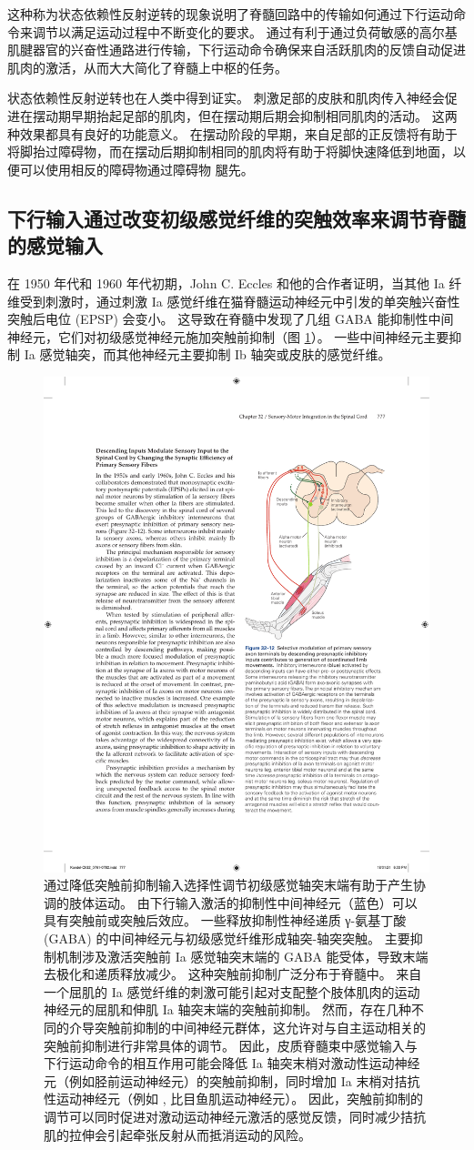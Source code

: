 这种称为状态依赖性反射逆转的现象说明了脊髓回路中的传输如何通过下行运动命令来调节以满足运动过程中不断变化的要求。 通过有利于通过负荷敏感的高尔基肌腱器官的兴奋性通路进行传输，下行运动命令确保来自活跃肌肉的反馈自动促进肌肉的激活，从而大大简化了脊髓上中枢的任务。

状态依赖性反射逆转也在人类中得到证实。 刺激足部的皮肤和肌肉传入神经会促进在摆动期早期抬起足部的肌肉，但在摆动期后期会抑制相同肌肉的活动。 这两种效果都具有良好的功能意义。 在摆动阶段的早期，来自足部的正反馈将有助于将脚抬过障碍物，而在摆动后期抑制相同的肌肉将有助于将脚快速降低到地面，以便可以使用相反的障碍物通过障碍物 腿先。

\subsection{下行输入通过改变初级感觉纤维的突触效率来调节脊髓的感觉输入}
在 1950 年代和 1960 年代初期，John C. Eccles 和他的合作者证明，当其他 Ia 纤维受到刺激时，通过刺激 Ia 感觉纤维在猫脊髓运动神经元中引发的单突触兴奋性突触后电位 (EPSP) 会变小。 
这导致在脊髓中发现了几组 GABA 能抑制性中间神经元，它们对初级感觉神经元施加突触前抑制（图 \ref{fig:32_12}）。 
一些中间神经元主要抑制 Ia 感觉轴突，而其他神经元主要抑制 Ib 轴突或皮肤的感觉纤维。

\begin{figure}[htbp]
	\centering
	\includegraphics[width=0.5\linewidth]{chap32/fig_32_12}
	\caption{通过降低突触前抑制输入选择性调节初级感觉轴突末端有助于产生协调的肢体运动。 由下行输入激活的抑制性中间神经元（蓝色）可以具有突触前或突触后效应。 一些释放抑制性神经递质 γ-氨基丁酸 (GABA) 的中间神经元与初级感觉纤维形成轴突-轴突突触。 主要抑制机制涉及激活突触前 Ia 感觉轴突末端的 GABA 能受体，导致末端去极化和递质释放减少。 这种突触前抑制广泛分布于脊髓中。 来自一个屈肌的 Ia 感觉纤维的刺激可能引起对支配整个肢体肌肉的运动神经元的屈肌和伸肌 Ia 轴突末端的突触前抑制。 然而，存在几种不同的介导突触前抑制的中间神经元群体，这允许对与自主运动相关的突触前抑制进行非常具体的调节。 因此，皮质脊髓束中感觉输入与下行运动命令的相互作用可能会降低 Ia 轴突末梢对激动性运动神经元（例如胫前运动神经元）的突触前抑制，同时增加 Ia 末梢对拮抗性运动神经元（例如 , 比目鱼肌运动神经元）。 因此，突触前抑制的调节可以同时促进对激动运动神经元激活的感觉反馈，同时减少拮抗肌的拉伸会引起牵张反射从而抵消运动的风险。}
	\label{fig:32_12}
\end{figure}


